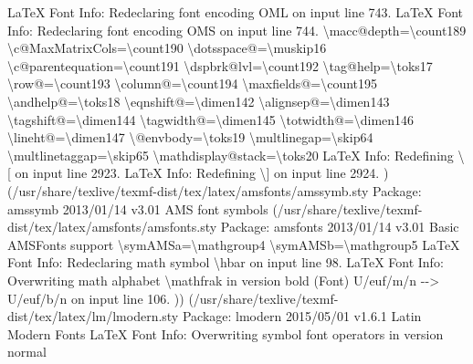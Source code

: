 \documentclass[
  letterpaper,
  DIV=11,
  numbers=noendperiod]{scrartcl}
\newenvironment{Shaded}{\begin{snugshade}}{\end{snugshade}}
\newcommand{\NormalTok}[1]{\textcolor[rgb]{0.00,0.23,0.31}{#1}}
\begin{document}
\begin{Shaded}
\begin{Highlighting}[]
\NormalTok{LaTeX Font Info:    Redeclaring font encoding OML on input line 743.}
\NormalTok{LaTeX Font Info:    Redeclaring font encoding OMS on input line 744.}
\NormalTok{\textbackslash{}macc@depth=\textbackslash{}count189}
\NormalTok{\textbackslash{}c@MaxMatrixCols=\textbackslash{}count190}
\NormalTok{\textbackslash{}dotsspace@=\textbackslash{}muskip16}
\NormalTok{\textbackslash{}c@parentequation=\textbackslash{}count191}
\NormalTok{\textbackslash{}dspbrk@lvl=\textbackslash{}count192}
\NormalTok{\textbackslash{}tag@help=\textbackslash{}toks17}
\NormalTok{\textbackslash{}row@=\textbackslash{}count193}
\NormalTok{\textbackslash{}column@=\textbackslash{}count194}
\NormalTok{\textbackslash{}maxfields@=\textbackslash{}count195}
\NormalTok{\textbackslash{}andhelp@=\textbackslash{}toks18}
\NormalTok{\textbackslash{}eqnshift@=\textbackslash{}dimen142}
\NormalTok{\textbackslash{}alignsep@=\textbackslash{}dimen143}
\NormalTok{\textbackslash{}tagshift@=\textbackslash{}dimen144}
\NormalTok{\textbackslash{}tagwidth@=\textbackslash{}dimen145}
\NormalTok{\textbackslash{}totwidth@=\textbackslash{}dimen146}
\NormalTok{\textbackslash{}lineht@=\textbackslash{}dimen147}
\NormalTok{\textbackslash{}@envbody=\textbackslash{}toks19}
\NormalTok{\textbackslash{}multlinegap=\textbackslash{}skip64}
\NormalTok{\textbackslash{}multlinetaggap=\textbackslash{}skip65}
\NormalTok{\textbackslash{}mathdisplay@stack=\textbackslash{}toks20}
\NormalTok{LaTeX Info: Redefining \textbackslash{}[ on input line 2923.}
\NormalTok{LaTeX Info: Redefining \textbackslash{}] on input line 2924.}
\NormalTok{) (/usr/share/texlive/texmf{-}dist/tex/latex/amsfonts/amssymb.sty}
\NormalTok{Package: amssymb 2013/01/14 v3.01 AMS font symbols}
\NormalTok{(/usr/share/texlive/texmf{-}dist/tex/latex/amsfonts/amsfonts.sty}
\NormalTok{Package: amsfonts 2013/01/14 v3.01 Basic AMSFonts support}
\NormalTok{\textbackslash{}symAMSa=\textbackslash{}mathgroup4}
\NormalTok{\textbackslash{}symAMSb=\textbackslash{}mathgroup5}
\NormalTok{LaTeX Font Info:    Redeclaring math symbol \textbackslash{}hbar on input line 98.}
\NormalTok{LaTeX Font Info:    Overwriting math alphabet \textasciigrave{}\textbackslash{}mathfrak\textquotesingle{} in version \textasciigrave{}bold\textquotesingle{}}
\NormalTok{(Font)                  U/euf/m/n {-}{-}\textgreater{} U/euf/b/n on input line 106.}
\NormalTok{)) (/usr/share/texlive/texmf{-}dist/tex/latex/lm/lmodern.sty}
\NormalTok{Package: lmodern 2015/05/01 v1.6.1 Latin Modern Fonts}
\NormalTok{LaTeX Font Info:    Overwriting symbol font \textasciigrave{}operators\textquotesingle{} in version \textasciigrave{}normal\textquotesingle{}}

\end{Highlighting}
\end{Shaded}
\end{document}
